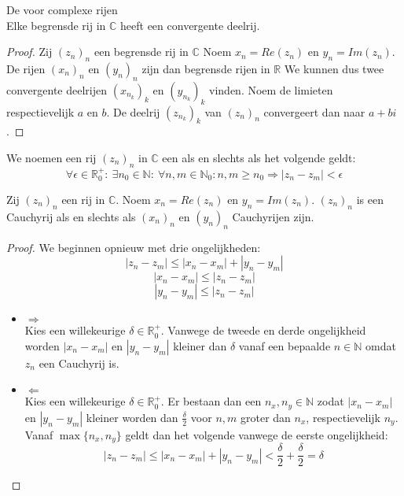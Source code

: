 \documentclass[main.tex]{subfiles}
\begin{document}
\begin{st}
  \label{st:bolzano-complexe-rijen}
  De  voor complexe rijen\\
  Elke begrensde rij in $\mathbb{C}$ heeft een convergente deelrij.

  \begin{proof}
    Zij $(z_{n})_{n}$ een begrensde rij in $\mathbb{C}$
    Noem $x_{n} = Re(z_{n})$ en $y_{n} = Im(z_{n})$.
    De rijen $(x_{n})_{n}$ en $(y_{n})_{n}$ zijn dan begrensde rijen in $\mathbb{R}$
    We kunnen dus twee convergente deelrijen $(x_{n_{k}})_{k}$ en $(y_{n_{k}})_{k}$ vinden.
    Noem de limieten respectievelijk $a$ en $b$.
    De deelrij $(z_{n_{k}})_{k}$ van $(z_{n})_{n}$ convergeert dan naar $a+bi$.
  \end{proof}
\end{st}

\begin{de}
  We noemen een rij $(z_{n})_{n}$ in $\mathbb{C}$ een  als en slechts als het volgende geldt:
  \[ \forall \epsilon \in \mathbb{R}_{0}^{+}:\ \exists n_{0}\in \mathbb{N}:\ \forall n,m\in \mathbb{N}_{0}: n,m\ge n_{0} \Rightarrow |z_{n}-z_{m}| < \epsilon \]
\end{de}

\begin{pr}
  Zij $(z_{n})_{n}$ een rij in $\mathbb{C}$.
  Noem $x_{n} = Re(z_{n})$ en $y_{n} = Im(z_{n})$.
  $(z_{n})_{n}$ is een Cauchyrij als en slechts als $(x_{n})_{n}$ en $(y_{n})_{n}$ Cauchyrijen zijn.

  \begin{proof}
    We beginnen opnieuw met drie ongelijkheden:
    \[ |z_{n}-z_{m}| \le |x_{n}-x_{m}| + |y_{n}-y_{m}| \]
    \[ |x_{n}-x_{m}| \le |z_{n}-z_{m}| \]
    \[ |y_{n}-y_{m}| \le |z_{n}-z_{m}| \]
    \begin{itemize}
    \item $\Rightarrow$\\
      Kies een willekeurige $\delta \in \mathbb{R}_{0}^{+}$.
      Vanwege de tweede en derde ongelijkheid worden $|x_{n}-x_{m}|$ en $|y_{n}-y_{m}|$ kleiner dan $\delta$ vanaf een bepaalde $n\in \mathbb{N}$ omdat $z_{n}$ een Cauchyrij is.
    \item $\Leftarrow$\\
      Kies een willekeurige $\delta \in \mathbb{R}_{0}^{+}$.
      Er bestaan dan een $n_{x},n_{y}\in \mathbb{N}$ zodat $|x_{n}-x_{m}|$ en $|y_{n}-y_{m}|$ kleiner worden dan $\frac{\delta}{2}$ voor $n,m$ groter dan $n_{x}$, respectievelijk $n_{y}$.
      Vanaf $\max\{n_{x},n_{y}\}$ geldt dan het volgende vanwege de eerste ongelijkheid:
      \[ |z_{n}-z_{m}| \le |x_{n}-x_{m}| + |y_{n}-y_{m}| < \frac{\delta}{2}+\frac{\delta}{2} = \delta \]
    \end{itemize}
  \end{proof}
\end{pr}
\end{document}
